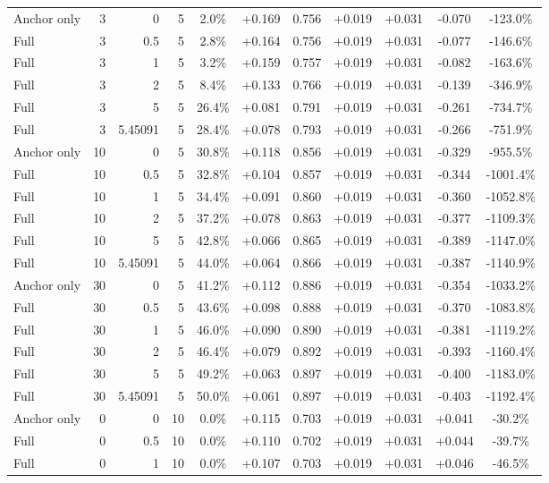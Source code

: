 \begin{table}[htbp]
\begin{tabular}{lrrrccccccc}
Anchor only & 3 & 0 & 5 & 2.0\% & +0.169 & 0.756 & +0.019 & +0.031 & -0.070 & -123.0\% \\
Full & 3 & 0.5 & 5 & 2.8\% & +0.164 & 0.756 & +0.019 & +0.031 & -0.077 & -146.6\% \\
Full & 3 & 1 & 5 & 3.2\% & +0.159 & 0.757 & +0.019 & +0.031 & -0.082 & -163.6\% \\
Full & 3 & 2 & 5 & 8.4\% & +0.133 & 0.766 & +0.019 & +0.031 & -0.139 & -346.9\% \\
Full & 3 & 5 & 5 & 26.4\% & +0.081 & 0.791 & +0.019 & +0.031 & -0.261 & -734.7\% \\
Full & 3 & 5.45091 & 5 & 28.4\% & +0.078 & 0.793 & +0.019 & +0.031 & -0.266 & -751.9\% \\
Anchor only & 10 & 0 & 5 & 30.8\% & +0.118 & 0.856 & +0.019 & +0.031 & -0.329 & -955.5\% \\
Full & 10 & 0.5 & 5 & 32.8\% & +0.104 & 0.857 & +0.019 & +0.031 & -0.344 & -1001.4\% \\
Full & 10 & 1 & 5 & 34.4\% & +0.091 & 0.860 & +0.019 & +0.031 & -0.360 & -1052.8\% \\
Full & 10 & 2 & 5 & 37.2\% & +0.078 & 0.863 & +0.019 & +0.031 & -0.377 & -1109.3\% \\
Full & 10 & 5 & 5 & 42.8\% & +0.066 & 0.865 & +0.019 & +0.031 & -0.389 & -1147.0\% \\
Full & 10 & 5.45091 & 5 & 44.0\% & +0.064 & 0.866 & +0.019 & +0.031 & -0.387 & -1140.9\% \\
Anchor only & 30 & 0 & 5 & 41.2\% & +0.112 & 0.886 & +0.019 & +0.031 & -0.354 & -1033.2\% \\
Full & 30 & 0.5 & 5 & 43.6\% & +0.098 & 0.888 & +0.019 & +0.031 & -0.370 & -1083.8\% \\
Full & 30 & 1 & 5 & 46.0\% & +0.090 & 0.890 & +0.019 & +0.031 & -0.381 & -1119.2\% \\
Full & 30 & 2 & 5 & 46.4\% & +0.079 & 0.892 & +0.019 & +0.031 & -0.393 & -1160.4\% \\
Full & 30 & 5 & 5 & 49.2\% & +0.063 & 0.897 & +0.019 & +0.031 & -0.400 & -1183.0\% \\
Full & 30 & 5.45091 & 5 & 50.0\% & +0.061 & 0.897 & +0.019 & +0.031 & -0.403 & -1192.4\% \\
Anchor only & 0 & 0 & 10 & 0.0\% & +0.115 & 0.703 & +0.019 & +0.031 & +0.041 & -30.2\% \\
Full & 0 & 0.5 & 10 & 0.0\% & +0.110 & 0.702 & +0.019 & +0.031 & +0.044 & -39.7\% \\
Full & 0 & 1 & 10 & 0.0\% & +0.107 & 0.703 & +0.019 & +0.031 & +0.046 & -46.5\% \\

\end{tabular}
\end{table}
